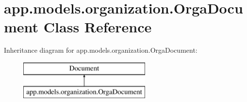 \hypertarget{classapp_1_1models_1_1organization_1_1_orga_document}{}\section{app.\+models.\+organization.\+Orga\+Document Class Reference}
\label{classapp_1_1models_1_1organization_1_1_orga_document}
Inheritance diagram for app.\+models.\+organization.\+Orga\+Document\+:\begin{figure}[H]
\begin{center}
\leavevmode
\includegraphics[height=2.000000cm]{classapp_1_1models_1_1organization_1_1_orga_document}
\end{center}
\end{figure}
